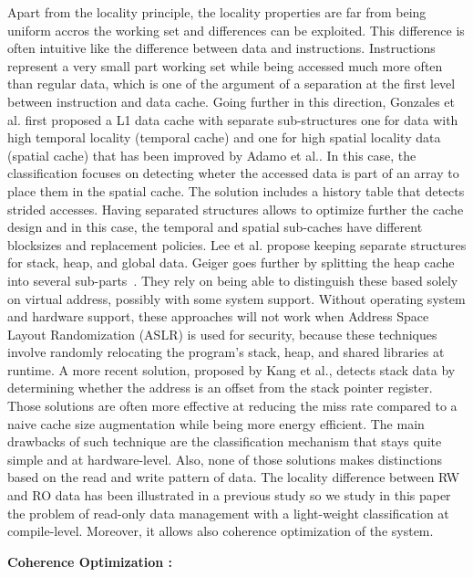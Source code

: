 \documentclass[sigconf]{acmart}
\begin{document}
Apart from the locality principle, the locality properties are far from being uniform accros the working set and differences can be exploited. This difference is often intuitive like the difference between data and instructions. Instructions represent a very small part working set while being accessed much more often than regular data, which is one of the argument of a separation at the first level between instruction and data cache. Going further in this direction, Gonzales et al.\cite{Gonzalez:1995} first proposed a L1 data cache with separate sub-structures one for data with high temporal locality (temporal cache) and one for high spatial locality data (spatial cache) that has been improved by Adamo et al.\cite{Adamo:2009}. In this case, the classification focuses on detecting wheter the accessed data is part of an array to place them in the spatial cache. The solution includes a history table that detects strided accesses. Having separated structures allows to optimize further the cache design and in this case, the temporal and spatial sub-caches have different blocksizes and replacement policies. Lee et al.\cite{Lee:2000} propose keeping separate structures for stack, heap, and global data. Geiger goes further by splitting the heap cache into several sub-parts~\cite{Geiger:2005}. They rely on being able to distinguish these based solely on virtual address, possibly with some system support. Without operating system and hardware support, these approaches will not work when Address Space Layout Randomization (ASLR) is used for security, because these techniques involve randomly relocating the program’s stack, heap, and shared libraries at runtime. A more recent solution, proposed by Kang et al.\cite{Kang:2011}, detects stack data by determining whether the address is an offset from the stack pointer register.
Those solutions are often more effective at reducing the miss rate compared to a naive cache size augmentation while being more energy efficient. The main drawbacks of such technique are the classification mechanism that stays quite simple and at hardware-level. Also, none of those solutions makes distinctions based on the read and write pattern of data. The locality difference between RW and RO data has been illustrated in a previous study \cite{vaumourin:2014} so we study in this paper the problem of read-only data management with a light-weight classification at compile-level. Moreover, it allows also coherence optimization of the system.

\textbf{Coherence Optimization :}
\end{document}
